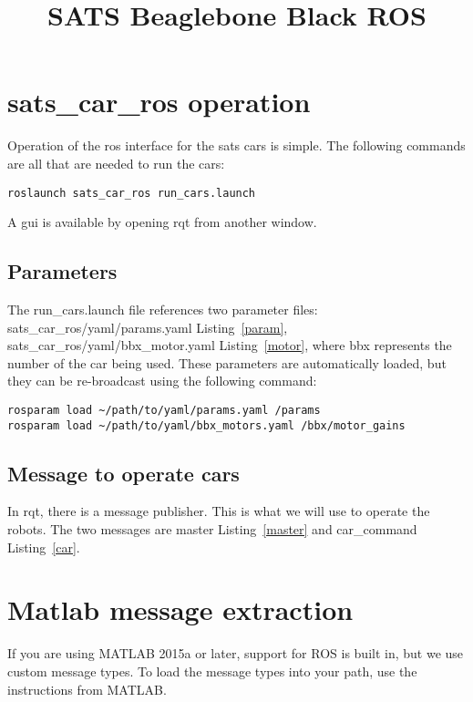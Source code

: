 \documentclass{article}
\title{SATS Beaglebone Black ROS}
\author{}
\begin{document}
\maketitle
\section{sats\_car\_ros operation}
Operation of the ros interface for the sats cars is simple. The following commands are all that are needed to run the cars: 
\begin{lstlisting}
roslaunch sats_car_ros run_cars.launch
\end{lstlisting}
A gui is available by opening rqt from another window. 

\subsection{Parameters}
The run\_cars.launch file references two parameter files: sats\_car\_ros/yaml/params.yaml Listing~\ref{param}, sats\_car\_ros/yaml/bbx\_motor.yaml Listing~\ref{motor}, where bbx represents the number of the car being used. These parameters are automatically loaded, but they can be re-broadcast using the following command:
\begin{lstlisting}
rosparam load ~/path/to/yaml/params.yaml /params
rosparam load ~/path/to/yaml/bbx_motors.yaml /bbx/motor_gains
\end{lstlisting}



\subsection{Message to operate cars}
In rqt, there is a message publisher. This is what we will use to operate the robots. The two messages are master Listing~\ref{master} and car\_command Listing~\ref{car}. 




\section{Matlab message extraction}
If you are using MATLAB 2015a or later, support for ROS is built in, but we use custom message types. To load the message types into your path, use the instructions from MATLAB. 
\end{document}
